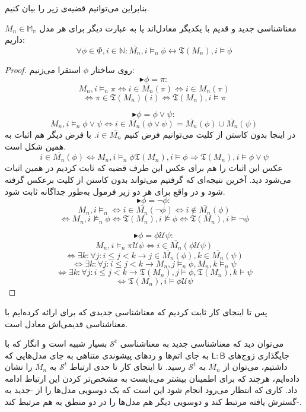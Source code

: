 بنابراین می‌توانیم قضیه‌ی زیر را بیان کنیم.
\begin{thm}
	معناشناسی جدید و قدیم با یکدیگر معادل‌اند یا به عبارت دیگر 
	برای هر مدل $M_n \in \mathbb{M_n}$ داریم:
	$$\forall \phi \in \Phi, i\in\mathbb{N}:\bar{M_n},i \models_n \phi \leftrightarrow \mathfrak{T}(M_n) , i \models \phi $$
\end{thm}

\begin{proof}
	روی ساختار $\phi$ استقرا می‌زنیم:
	$$\blacktriangleright \phi=\pi:$$
	$$M_n , i \models_n \pi \iff i \in \bar{M_n} (\pi) \iff i \in M_n(\pi)$$
	$$\iff \pi \in \mathfrak{T}(M_n)(i) \iff \mathfrak{T}(M_n),i \models \pi $$
	
	$$\blacktriangleright \phi=\phi \lor \psi:$$
	$$M_n , i \models_n \phi \lor \psi  \iff i\in \bar{M_n}(\phi \lor \psi) = \bar{M_n} (\phi) \cup \bar{M_n}(\psi)$$
	در اینجا بدون کاستن از کلیت می‌توانیم فرض کنیم $i \in \bar{M_n}$. با فرض دیگر هم اثبات به همین شکل است.
	$$i \in \bar{M_n}(\phi) \iff M_n,i\models_n \phi \mathfrak{T}(M_n),i \models \phi \Rightarrow \mathfrak{T}(M_n),i\models \phi \lor \psi$$
	عکس این اثبات را هم برای عکس این طرف قضیه که ثابت کردیم در همین اثبات می‌شود دید. آخرین نتیجه‌ای که گرفتیم می‌تواند بدون کاستن از کلیت برعکس گرفته شود و در واقع برای هر دو زیر فرمول به‌طور جداگانه ثابت شود.
	$$\blacktriangleright \phi=\neg \phi:$$
	$$M_n,i \models_n \iff i \in \bar{M_n}(\neg \phi) \iff i \notin \bar{M_n}(\phi)$$
	$$\iff M_n ,i \nvDash_n \phi \iff \mathfrak{T}(M_n),i \nvDash \phi \iff \mathfrak{T} (M_n) ,i \models \neg \phi$$ 

	$$\blacktriangleright \phi=\phi \mathcal{U} \psi:$$
	$$M_n,i \models_n \pi \mathcal{U} \psi \iff i \in \bar{M_n}(\phi \mathcal{U}\psi)$$
	$$\iff \exists k: \forall j: i \leq j < k \rightarrow j \in \bar{M_n}(\phi) , k \in \bar{M_n}(\psi)$$
	$$\iff \exists k: \forall j: i \leq j < k \rightarrow M_n,j \models_n\phi ,  M_n,k\models_n \psi$$
	$$\iff \exists k: \forall j: i \leq j < k \rightarrow \mathfrak{T}(M_n),j \models\phi ,  \mathfrak{T}(M_n),k\models \psi$$
	$$\iff \mathfrak{T}(M_n),i \models \phi \mathcal{U} \psi$$

\end{proof}

پس تا اینجای کار ثابت کردیم که معناشناسی جدیدی که برای  ارائه کرده‌ایم با معناشناسی قدیمی‌اش معادل است. 

می‌توان دید که معناشناسی جدید به معناشناسی‌ 
$\mathcal{S}^t$
 بسیار شبیه است و انگار که با جایگذاری زوج‌های 
 $\mathsf{L:B}$ به جای اتم‌ها و ردهای پیشوندی متناهی به جای مدل‌هایی که داشتیم، می‌توان 
 از 
$\bar{M_n}$
به 
$\mathcal{S}^t$
رسید. تا اینجای کار تا حدی ارتباط $\mathcal{S}^t$ به $\bar{M}_n$ را نشان داده‌ایم، هرچند که برای اطمینان بیشتر می‌بایست به مشخص‌تر کردن این ارتباط ادامه داد. کاری که انتظار می‌رود انجام شود این است که یک دوسویی مدل‌ها را از -جدید به -گسترش یافته مرتبط کند و دوسویی دیگر هم مدل‌ها را در دو منطق به هم مرتبط کند.

